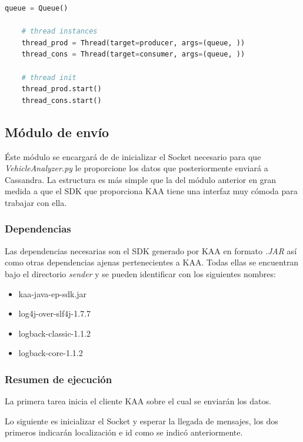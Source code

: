\begin{lstlisting}[language=python,caption={Inicialización de las hebras},label={lst:pi1}]
	queue = Queue()

	# thread instances
	thread_prod = Thread(target=producer, args=(queue, ))
	thread_cons = Thread(target=consumer, args=(queue, ))

	# thread init
	thread_prod.start()
	thread_cons.start()

\end{lstlisting}

\newpage

\subsection{Módulo de envío}

Éste módulo se encargará de de inicializar el Socket necesario para que \textit{VehicleAnalyzer.py} le proporcione los datos que posteriormente enviará a Cassandra. La estructura es más simple que la del módulo anterior en gran medida a que el SDK que proporciona KAA tiene una interfaz muy cómoda para trabajar con ella.

\subsubsection{Dependencias}

Las dependencias necesarias son el SDK generado por KAA en formato \textit{.JAR} así como otras dependencias ajenas pertenecientes a KAA. Todas ellas se encuentran bajo el directorio \textit{sender} y se pueden identificar con los siguientes nombres:

\begin{itemize}
	\item kaa-java-ep-sdk.jar
	\item log4j-over-slf4j-1.7.7
	\item logback-classic-1.1.2
	\item logback-core-1.1.2
\end{itemize}

\subsubsection{Resumen de ejecución}

La primera tarea inicia el cliente KAA  sobre el cual se enviarán los datos.

Lo siguiente es inicializar el Socket y esperar la llegada de mensajes, los dos primeros indicarán localización e id como se indicó anteriormente.

